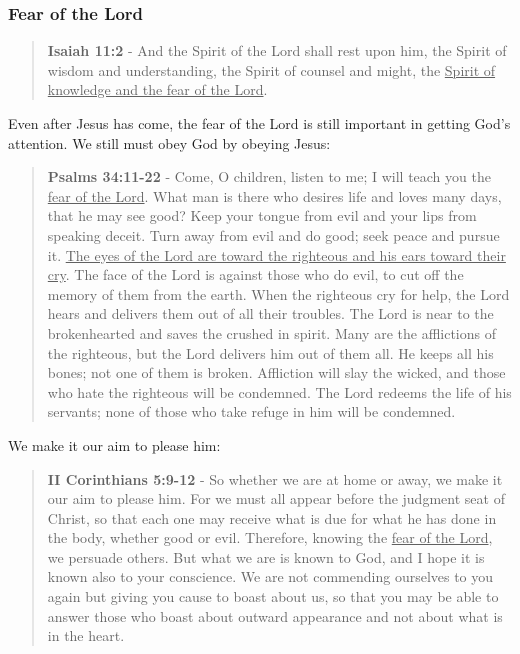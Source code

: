 \documentclass[11pt]{article}
\begin{document}
\subsubsection{Fear of the Lord}
\label{sec:org30f7312}
\begin{quote}
\textbf{Isaiah 11:2} - And the Spirit of the Lord shall rest upon him, the Spirit of wisdom and understanding, the Spirit of counsel and might, the \uline{Spirit of knowledge and the fear of the Lord}.
\end{quote}

Even after Jesus has come, the fear of the Lord is still important in getting God's attention. We still must obey God by obeying Jesus:

\begin{quote}
\textbf{Psalms 34:11-22} - Come, O children, listen to me; I will teach you the \uline{fear of the Lord}. What man is there who desires life and loves many days, that he may see good? Keep your tongue from evil and your lips from speaking deceit. Turn away from evil and do good; seek peace and pursue it. \uline{The eyes of the Lord are toward the righteous and his ears toward their cry}. The face of the Lord is against those who do evil, to cut off the memory of them from the earth. When the righteous cry for help, the Lord hears and delivers them out of all their troubles. The Lord is near to the brokenhearted and saves the crushed in spirit. Many are the afflictions of the righteous, but the Lord delivers him out of them all. He keeps all his bones; not one of them is broken. Affliction will slay the wicked, and those who hate the righteous will be condemned. The Lord redeems the life of his servants; none of those who take refuge in him will be condemned.
\end{quote}

We make it our aim to please him:

\begin{quote}
\textbf{II Corinthians 5:9-12} - So whether we are at home or away, we make it our aim to please him. For we must all appear before the judgment seat of Christ, so that each one may receive what is due for what he has done in the body, whether good or evil. Therefore, knowing the \uline{fear of the Lord}, we persuade others. But what we are is known to God, and I hope it is known also to your conscience. We are not commending ourselves to you again but giving you cause to boast about us, so that you may be able to answer those who boast about outward appearance and not about what is in the heart.
\end{quote}
\end{document}
